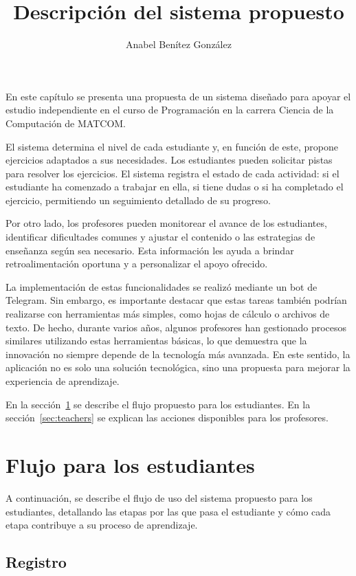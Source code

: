 \documentclass{article}
\title{Descripción del sistema propuesto}
\author{Anabel Benítez González}
\date{}
\begin{document}
\maketitle

En este capítulo se presenta una propuesta de un sistema diseñado para apoyar el estudio independiente en el curso de Programación en la carrera Ciencia de la Computación de \mbox{MATCOM}.

El sistema determina el nivel de cada estudiante y, en función de este, propone ejercicios adaptados a sus necesidades. Los estudiantes pueden solicitar pistas para resolver los ejercicios. El sistema registra el estado de cada actividad: si el estudiante ha comenzado a trabajar en ella, si tiene dudas o si ha completado el ejercicio, permitiendo un seguimiento detallado de su progreso.

Por otro lado, los profesores pueden monitorear el avance de los estudiantes, identificar dificultades comunes y ajustar el contenido o las estrategias de enseñanza según sea necesario. Esta información les ayuda a brindar retroalimentación oportuna y a personalizar el apoyo ofrecido.

La implementación de estas funcionalidades se realizó mediante un bot de Telegram. Sin embargo, es importante destacar que estas tareas también podrían realizarse con herramientas más simples, como hojas de cálculo o archivos de texto. De hecho, durante varios años, algunos profesores han gestionado procesos similares utilizando estas herramientas básicas, lo que demuestra que la innovación no siempre depende de la tecnología más avanzada. En este sentido, la aplicación no es solo una solución tecnológica, sino una propuesta para mejorar la experiencia de aprendizaje.

En la sección~\ref{sec:students} se describe el flujo propuesto para los estudiantes. En la sección~\ref{sec:teachers} se explican las acciones disponibles para los profesores.

\section{Flujo para los estudiantes}\label{sec:students}

A continuación, se describe el flujo de uso del sistema propuesto para los estudiantes, detallando las etapas por las que pasa el estudiante y cómo cada etapa contribuye a su proceso de aprendizaje.

\subsection{Registro}
\end{document}
